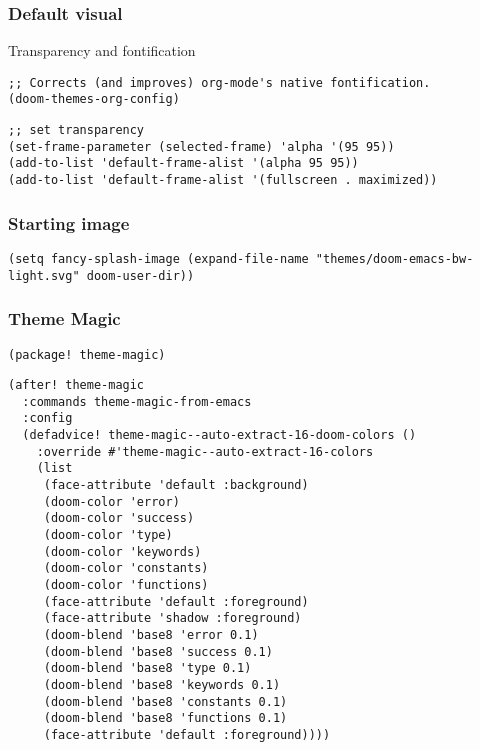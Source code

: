 \documentclass[c]{article}
\theoremstyle{plain}%
\theoremstyle{definition}
\theoremstyle{remark}
\begin{document}
\subsubsection{Default visual}
\label{sec:org9b1ad5d}
Transparency and fontification
\begin{verbatim}
;; Corrects (and improves) org-mode's native fontification.
(doom-themes-org-config)
\end{verbatim}
\begin{verbatim}
;; set transparency
(set-frame-parameter (selected-frame) 'alpha '(95 95))
(add-to-list 'default-frame-alist '(alpha 95 95))
(add-to-list 'default-frame-alist '(fullscreen . maximized))
\end{verbatim}
\subsubsection{Starting image}
\label{sec:org47a4690}
\begin{verbatim}
(setq fancy-splash-image (expand-file-name "themes/doom-emacs-bw-light.svg" doom-user-dir))
\end{verbatim}
\subsubsection{Theme Magic}
\label{sec:org57a29e0}
\begin{verbatim}
(package! theme-magic)
\end{verbatim}
\begin{verbatim}
(after! theme-magic
  :commands theme-magic-from-emacs
  :config
  (defadvice! theme-magic--auto-extract-16-doom-colors ()
    :override #'theme-magic--auto-extract-16-colors
    (list
     (face-attribute 'default :background)
     (doom-color 'error)
     (doom-color 'success)
     (doom-color 'type)
     (doom-color 'keywords)
     (doom-color 'constants)
     (doom-color 'functions)
     (face-attribute 'default :foreground)
     (face-attribute 'shadow :foreground)
     (doom-blend 'base8 'error 0.1)
     (doom-blend 'base8 'success 0.1)
     (doom-blend 'base8 'type 0.1)
     (doom-blend 'base8 'keywords 0.1)
     (doom-blend 'base8 'constants 0.1)
     (doom-blend 'base8 'functions 0.1)
     (face-attribute 'default :foreground))))

\end{verbatim}
\end{document}
